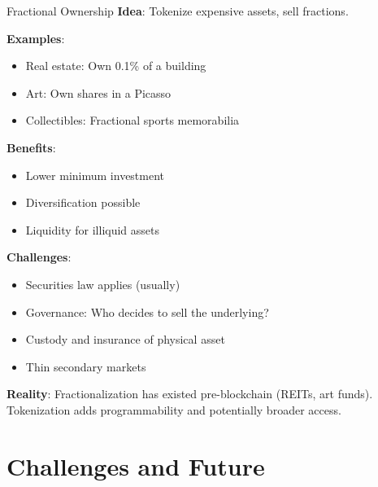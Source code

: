 \documentclass[10pt]{beamer}
\begin{document}
\begin{frame}{Fractional Ownership}
  \textbf{Idea}: Tokenize expensive assets, sell fractions.
  
  \vspace{0.5em}
  \textbf{Examples}:
  \begin{itemize}
    \item Real estate: Own 0.1\% of a building
    \item Art: Own shares in a Picasso
    \item Collectibles: Fractional sports memorabilia
  \end{itemize}
  
  \vspace{0.5em}
  \textbf{Benefits}:
  \begin{itemize}
    \item Lower minimum investment
    \item Diversification possible
    \item Liquidity for illiquid assets
  \end{itemize}
  
  \vspace{0.5em}
  \textbf{Challenges}:
  \begin{itemize}
    \item Securities law applies (usually)
    \item Governance: Who decides to sell the underlying?
    \item Custody and insurance of physical asset
    \item Thin secondary markets
  \end{itemize}
  
  \vspace{0.5em}
  \textbf{Reality}: Fractionalization has existed pre-blockchain (REITs, art funds). Tokenization adds programmability and potentially broader access.
\end{frame}

\section{Challenges and Future}
\end{document}
